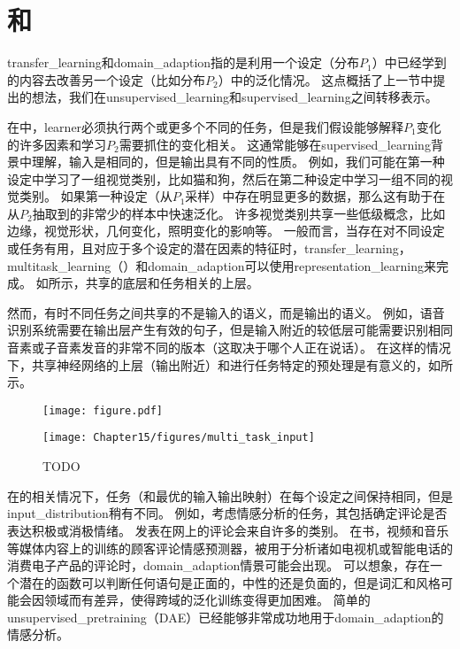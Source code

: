 
\section{和}
\label{sec:transfer_learning_and_domain_adaptation}
\gls{transfer_learning}和\gls{domain_adaption}指的是利用一个设定（分布$P_1$）中已经学到的内容去改善另一个设定（比如分布$P_2$）中的泛化情况。
这点概括了上一节中提出的想法，我们在\gls{unsupervised_learning}和\gls{supervised_learning}之间转移表示。


在中，\gls{learner}必须执行两个或更多个不同的任务，但是我们假设能够解释$P_1$变化的许多因素和学习$P_2$需要抓住的变化相关。
这通常能够在\gls{supervised_learning}背景中理解，输入是相同的，但是输出具有不同的性质。
例如，我们可能在第一种设定中学习了一组视觉类别，比如猫和狗，然后在第二种设定中学习一组不同的视觉类别。
如果第一种设定（从$P_1$采样）中存在明显更多的数据，那么这有助于在从$P_2$抽取到的非常少的样本中快速泛化。
许多视觉类别共享一些低级概念，比如边缘，视觉形状，几何变化，照明变化的影响等。
一般而言，当存在对不同设定或任务有用，且对应于多个设定的潜在因素的特征时，\gls{transfer_learning}，\gls{multitask_learning}（）和\gls{domain_adaption}可以使用\gls{representation_learning}来完成。
如所示，共享的底层和任务相关的上层。


然而，有时不同任务之间共享的不是输入的语义，而是输出的语义。
例如，语音识别系统需要在输出层产生有效的句子，但是输入附近的较低层可能需要识别相同音素或子音素发音的非常不同的版本（这取决于哪个人正在说话）。
在这样的情况下，共享神经网络的上层（输出附近）和进行任务特定的预处理是有意义的，如所示。

\begin{figure}[!htb]
\ifOpenSource
\centerline{\texttt{[image: figure.pdf]}}
\else
\centerline{\texttt{[image: Chapter15/figures/multi\_task\_input]}}
\fi
\caption{TODO}
\label{fig:chap15_multi_task_input}
\end{figure}

在的相关情况下，任务（和最优的输入输出映射）在每个设定之间保持相同，但是\gls{input_distribution}稍有不同。 
例如，考虑情感分析的任务，其包括确定评论是否表达积极或消极情绪。 
发表在网上的评论会来自许多的类别。
在书，视频和音乐等媒体内容上的训练的顾客评论情感预测器，被用于分析诸如电视机或智能电话的消费电子产品的评论时，\gls{domain_adaption}情景可能会出现。
可以想象，存在一个潜在的函数可以判断任何语句是正面的，中性的还是负面的，但是词汇和风格可能会因领域而有差异，使得跨域的泛化训练变得更加困难。
简单的\gls{unsupervised_pretraining}（\gls{DAE}）已经能够非常成功地用于\gls{domain_adaption}的情感分析\citep{Glorot+al-ICML-2011}。

